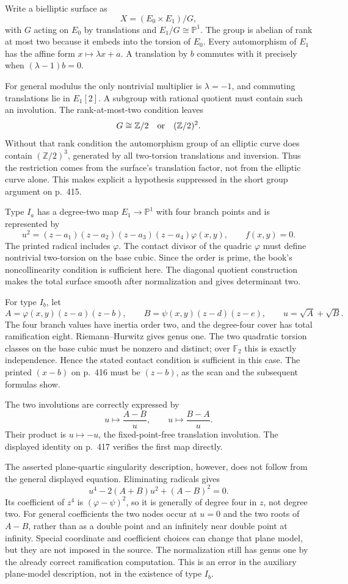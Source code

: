 Write a bielliptic surface as
\[
 X=(E_0\times E_1)/G,
\]
with $G$ acting on $E_0$ by translations and $E_1/G\cong\mathbb P^1$. The group is abelian of rank at most two because it embeds into the torsion of $E_0$. Every automorphism of $E_1$ has the affine form $x\mapsto\lambda x+a$. A translation by $b$ commutes with it precisely when $(\lambda-1)b=0$.

For general modulus the only nontrivial multiplier is $\lambda=-1$, and commuting translations lie in $E_1[2]$. A subgroup with rational quotient must contain such an involution. The rank-at-most-two condition leaves
\[
 G\cong\mathbb Z/2\quad\hbox{or}\quad(\mathbb Z/2)^2.
\]
Without that rank condition the automorphism group of an elliptic curve does contain $(\mathbb Z/2)^3$, generated by all two-torsion translations and inversion. Thus the restriction comes from the surface's translation factor, not from the elliptic curve alone. This makes explicit a hypothesis suppressed in the short group argument on p.~415.

Type $I_a$ has a degree-two map $E_1\to\mathbb P^1$ with four branch points and is represented by
\[
 u^2=(z-a_1)(z-a_2)(z-a_3)(z-a_4)\varphi(x,y),
 \qquad f(x,y)=0.
\]
The printed radical includes $\varphi$. The contact divisor of the quadric $\varphi$ must define nontrivial two-torsion on the base cubic. Since the order is prime, the book's noncollinearity condition is sufficient here. The diagonal quotient construction makes the total surface smooth after normalization and gives determinant two.

For type $I_b$, let
\[
 A=\varphi(x,y)(z-a)(z-b),\qquad
 B=\psi(x,y)(z-d)(z-e),\qquad u=\sqrt A+\sqrt B.
\]
The four branch values have inertia order two, and the degree-four cover has total ramification eight. Riemann--Hurwitz gives genus one. The two quadratic torsion classes on the base cubic must be nonzero and distinct; over $\mathbb F_2$ this is exactly independence. Hence the stated contact condition is sufficient in this case. The printed $(x-b)$ on p.~416 must be $(z-b)$, as the scan and the subsequent formulas show.

The two involutions are correctly expressed by
\[
 u\longmapsto\frac{A-B}{u},\qquad
 u\longmapsto\frac{B-A}{u}.
\]
Their product is $u\mapsto-u$, the fixed-point-free translation involution. The displayed identity on p.~417 verifies the first map directly.

The asserted plane-quartic singularity description, however, does not follow from the general displayed equation. Eliminating radicals gives
\[
 u^4-2(A+B)u^2+(A-B)^2=0.
\]
Its coefficient of $z^4$ is $(\varphi-\psi)^2$, so it is generally of degree four in $z$, not degree two. For general coefficients the two nodes occur at $u=0$ and the two roots of $A-B$, rather than as a double point and an infinitely near double point at infinity. Special coordinate and coefficient choices can change that plane model, but they are not imposed in the source. The normalization still has genus one by the already correct ramification computation. This is an error in the auxiliary plane-model description, not in the existence of type $I_b$.

